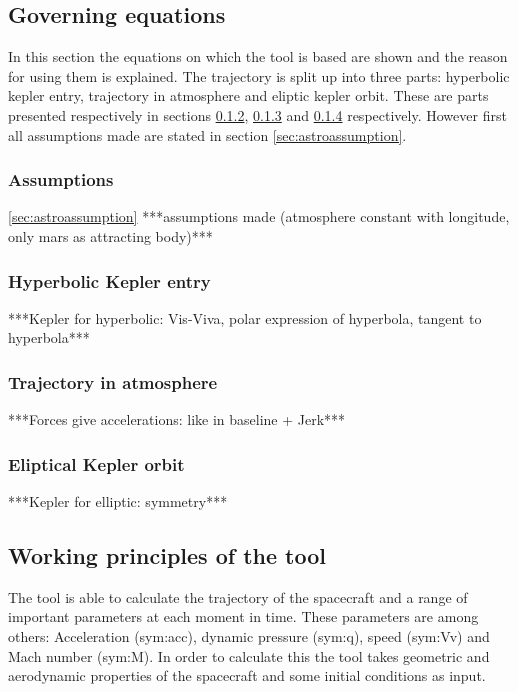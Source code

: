 \subsection{Governing equations}
\label{sec:astrogov}
In this section the equations on which the tool is based are shown and the reason for using them is explained. The trajectory is split up into three parts: hyperbolic kepler entry, trajectory in atmosphere and eliptic kepler orbit. These are parts presented respectively in sections \ref{sec:hypkep}, \ref{sec:trajatmos} and \ref{sec:eliptickep} respectively. However first all assumptions made are stated in section \ref{sec:astroassumption}.
\subsubsection{Assumptions}
 \ref{sec:astroassumption}
 ***assumptions made (atmosphere constant with longitude, only mars as attracting body)***\\
\subsubsection{Hyperbolic Kepler entry}
 \label{sec:hypkep}
***Kepler for hyperbolic: Vis-Viva, polar expression of hyperbola, tangent to hyperbola***\\
\subsubsection{Trajectory in atmosphere}
 \label{sec:trajatmos}
***Forces give accelerations: like in baseline + Jerk***\\
\subsubsection{Eliptical Kepler orbit}
 \label{sec:eliptickep}
***Kepler for elliptic: symmetry***\\

\subsection{Working principles of the tool}
\label{sec:astrowp}
The tool is able to calculate the trajectory of the spacecraft and a range of important parameters at each moment in time. These parameters are among others: Acceleration (\gls{sym:acc}), dynamic pressure (\gls{sym:q}), speed (\gls{sym:Vv}) and Mach number (\gls{sym:M}). In order to calculate this the tool takes geometric and aerodynamic properties of the spacecraft and some initial conditions as input.

